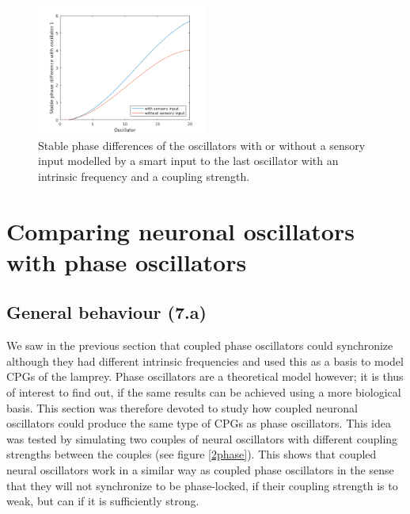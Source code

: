 \documentclass[a4paper]{scrartcl}
\begin{document}
\begin{figure}[b]
	\centering
	\includegraphics[width= 0.5\textwidth]{fig/figure6c_phasediff-sensory.png}
	\caption{Stable phase differences of the oscillators with or without a sensory input modelled by a smart input to the last oscillator with an intrinsic frequency and a coupling strength.}
	\label{fig:sensoryphase}
\end{figure}

\FloatBarrier

\section{Comparing neuronal oscillators with phase oscillators}
\subsection{General behaviour (7.a)}

We saw in the previous section that coupled phase oscillators could synchronize although they had different intrinsic frequencies and used this as a basis to model CPGs of the lamprey. Phase oscillators are a theoretical model however; it is thus of interest to find out, if the same results can be achieved using a more biological basis. This section was therefore devoted to study how coupled neuronal oscillators could produce the same type of CPGs as phase oscillators. This idea was tested by simulating two couples of neural oscillators with different coupling strengths between the couples (see figure \ref{2phase}). This shows that coupled neural oscillators work in a similar way as coupled phase oscillators in the sense that they will not synchronize to be phase-locked, if their coupling strength is to weak, but can if it is sufficiently strong. 
\end{document}
